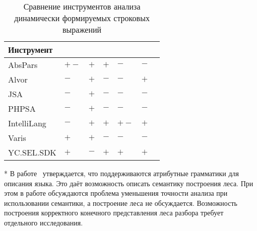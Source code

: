 \begin{table} [h]
  \centering
\parbox{14cm}{\caption{Сравнение инструментов анализа динамически формируемых строковых выражений}\label{tbl:comparison}}
\begin{threeparttable}
  
  \begin{tabular}{| p{2.7cm} || p{2.4cm} | p{2.4cm} | p{2.4cm} | p{2.4cm} | p{2.4cm}l |}
  \hline                               
  \hline
  {Инструмент}   &\centering {Лес разбора}           &\centering {Синт. ошибки}        &\centering {Сем. ошибки}    &\centering {Платформа}         &\centering {Модульность} & \\
  \hline                                                                                                                                       
  AbsPars        &\centering  $+-$\tnote{*}          &\centering  $+$                  &\centering  $+$             &\centering  $-$                &\centering  $-$        & \\
  Alvor          &\centering  $-$                    &\centering  $+$                  &\centering  $-$             &\centering  $-$                &\centering  $+$        &\\
  JSA            &\centering  $-$                    &\centering  $+$                  &\centering  $-$             &\centering  $-$                &\centering  $-$        &\\
  PHPSA          &\centering  $-$                    &\centering  $+$                  &\centering  $-$             &\centering  $-$                &\centering  $-$        &\\
  IntelliLang    &\centering  $-$                    &\centering  $+$                  &\centering  $+$             &\centering  $+-$\tnote{**}     &\centering  $+$        &\\
  Varis          &\centering  $+$\tnote{***}         &\centering  $+$                  &\centering  $-$             &\centering  $-$                &\centering  $-$        &\\
  YC.SEL.SDK     &\centering  $+$                    &\centering  $-$\tnote{****}      &\centering  $+$             &\centering  $+$                &\centering  $+$        &\\
  \hline
  \hline
  \end{tabular}\small{
  \begin{tablenotes}
            \item[*] В работе~\cite{LRAbstractParsingSema} утверждается, что поддерживаются атрибутные грамматики для описания языка. Это даёт возможность описать семантику построения леса. При этом в работе обсуждаются проблема уменьшения точности анализа при использовании семантики, а построение леса не обсуждается. Возможность построения корректного конечного представления леса разбора требует отдельного исследования.

\end{tablenotes}}
\end{threeparttable}
\end{table}
